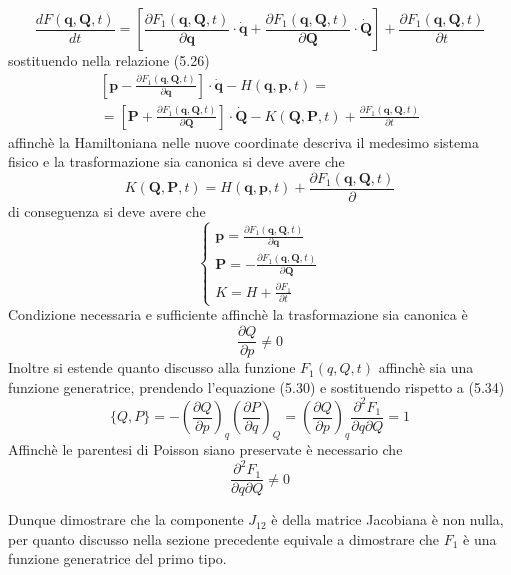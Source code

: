 \begin{equation}
	\frac{d F(\mathbf{q}, \mathbf{Q}, t)}{d t}=\left[\frac{\partial F_1(\mathbf{q}, \mathbf{Q}, t)}{\partial \mathbf{q}} \cdot \dot{\mathbf{q}}+\frac{\partial F_1(\mathbf{q}, \mathbf{Q}, t)}{\partial \mathbf{Q}} \cdot \dot{\mathbf{Q}}\right]+\frac{\partial F_1(\mathbf{q}, \mathbf{Q}, t)}{\partial t}
\end{equation}
sostituendo nella relazione (5.26)
\begin{align*}
	&\left[\mathbf{p}-\frac{\partial F_1(\mathbf{q}, \mathbf{Q}, t)}{\partial \mathbf{q}}\right] \cdot \dot{\mathbf{q}}-H(\mathbf{q}, \mathbf{p}, t)= & \\[0.4cm]
	&=\left[\mathbf{P}+\frac{\partial F_1(\mathbf{q}, \mathbf{Q}, t)}{\partial \mathbf{Q}}\right] \cdot \dot{\mathbf{Q}}-K(\mathbf{Q}, \mathbf{P}, t)+\frac{\partial F_1(\mathbf{q}, \mathbf{Q}, t)}{\partial t}
\end{align*}
affinch\`{e} la Hamiltoniana nelle nuove coordinate descriva il medesimo sistema fisico e la trasformazione sia canonica si deve avere che 
\begin{equation}
	K(\mathbf{Q}, \mathbf{P}, t)=H(\mathbf{q}, \mathbf{p}, t)+\frac{\partial F_1(\mathbf{q}, \mathbf{Q}, t)}{\partial}
\end{equation}
di conseguenza si deve avere che 
\begin{equation}
	\begin{cases}
	\mathbf{p}=\frac{\partial F_1(\mathbf{q}, \mathbf{Q}, t)}{\partial \mathbf{q}} \\
	 \mathbf{P}=-\frac{\partial F_1(\mathbf{q}, \mathbf{Q}, t)}{\partial \mathbf{Q}}\\
	 K = H + \frac{\partial F_1}{\partial t}
	\end{cases}
\end{equation}
Condizione necessaria e sufficiente affinch\`{e} la trasformazione sia canonica \`{e}
\begin{equation}
	\frac{\partial Q}{\partial p} \neq  0
\end{equation}	
Inoltre si estende quanto discusso alla funzione $F_1(q,Q,t)$ affinch\`{e} sia una funzione generatrice, prendendo l'equazione (5.30) e sostituendo rispetto a (5.34)
\begin{equation}
	\{Q,P\} = -\left(\frac{\partial Q}{\partial p}\right)_q\left(\frac{\partial P}{\partial q}\right)_Q = \left(\frac{\partial Q}{\partial p}\right)_q \frac{\partial^2 F_1}{\partial q \partial Q } = 1
\end{equation}
\newline
Affinch\`{e} le parentesi di Poisson siano preservate \`{e} necessario che
\begin{equation}
	\frac{\partial^2 F_1}{\partial q \partial Q } \neq 0
\end{equation} 
\begin{remark}
Dunque dimostrare che la componente $J_{12}$ \`{e} della matrice Jacobiana \`{e} non nulla, per quanto discusso nella sezione precedente equivale a dimostrare che $F_1$ \`{e} una funzione generatrice del primo tipo. 	
\end{remark}

